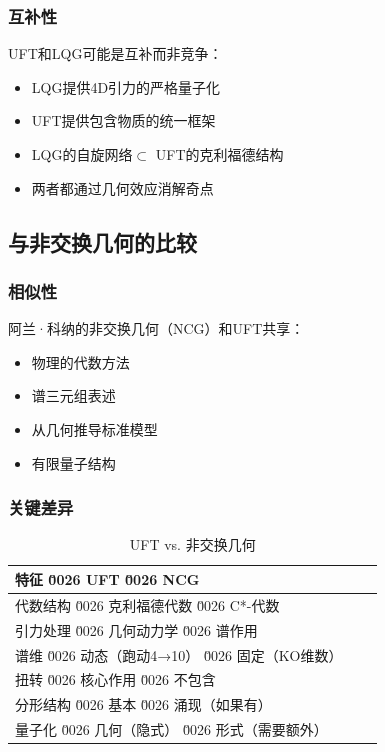 \subsubsection{互补性}

UFT和LQG可能是互补而非竞争：
\begin{itemize}
    \item LQG提供4D引力的严格量子化
    \item UFT提供包含物质的统一框架
    \item LQG的自旋网络$\subset$ UFT的克利福德结构
    \item 两者都通过几何效应消解奇点
\end{itemize}

\subsection{与非交换几何的比较}

\subsubsection{相似性}

阿兰·科纳的非交换几何（NCG）和UFT共享：
\begin{itemize}
    \item 物理的代数方法
    \item 谱三元组表述
    \item 从几何推导标准模型
    \item 有限量子结构
\end{itemize}

\subsubsection{关键差异}

\begin{table}[htbp]
\centering
\caption{UFT vs. 非交换几何}
\begin{tabular}{@{}lcc@{}}
\toprule
\textbf{特征} \u0026 \textbf{UFT} \u0026 \textbf{NCG} \\
\midrule
代数结构 \u0026 克利福德代数 \u0026 C*-代数 \\
引力处理 \u0026 几何动力学 \u0026 谱作用 \\
谱维 \u0026 动态（跑动4→10） \u0026 固定（KO维数） \\
扭转 \u0026 核心作用 \u0026 不包含 \\
分形结构 \u0026 基本 \u0026 涌现（如果有） \\
量子化 \u0026 几何（隐式） \u0026 形式（需要额外） \\
\bottomrule
\end{tabular}
\label{tab:ncg_comparison}
\end{table}


